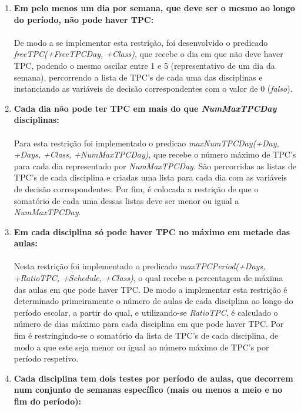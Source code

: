 \documentclass{llncs}
\begin{document}
\begin{enumerate}
	\item \textbf{Em pelo menos um dia por semana, que deve ser o mesmo ao longo do período, não pode haver TPC:}\\\\	               
		De modo a se implementar esta restrição, foi desenvolvido o predicado \textit{freeTPC(+FreeTPCDay, +Class)}, que recebe o dia em que não deve haver TPC, podendo o mesmo oscilar entre 1 e 5 (representativo de um dia da semana), percorrendo a lista de TPC's de cada uma das disciplinas e instanciando as variáveis de decisão correspondentes com o valor de 0 (\textit{falso}).
		\\
	\item \textbf{Cada dia não pode ter TPC em mais do que \textit{NumMaxTPCDay} disciplinas:}\\\\	               
		Para esta restrição foi implementado o predicao \textit{maxNumTPCDay(+Day, +Days, +Class, +NumMaxTPCDay)}, que recebe o número máximo de TPC's para cada dia representado por \textit{NumMaxTPCDay}. São percorridas as listas de TPC's de cada disciplina e criadas uma lista para cada dia com   as variáveis de decisão correspondentes. Por fim, é colocada a restrição de que o somatório de cada uma dessas listas deve ser menor ou igual a \textit{NumMaxTPCDay}.
		\\
	\item \textbf{Em cada disciplina só pode haver TPC no máximo em metade das aulas:}\\\\	               
		Nesta restrição foi implementado o predicado \textit{maxTPCPeriod(+Days, +RatioTPC, +Schedule, +Class)}, o qual recebe a percentagem de máxima das aulas em que pode haver TPC. De modo a implementar esta restrição é determinado primeiramente o número de aulas de cada disciplina ao longo do período escolar, a partir do qual, e utilizando-se \textit{RatioTPC}, é calculado o número de dias máximo para cada disciplina em que pode haver TPC. Por fim é restringindo-se o somatório da lista de TPC's de cada disciplina, de modo a que este seja menor ou igual ao número máximo de TPC's por período respetivo.
		\\
	\item \textbf{ Cada disciplina tem dois testes por período de aulas, que decorrem num conjunto de semanas específico (mais ou menos a meio e no fim do período):}\\\\	               

\end{enumerate}
\end{document}
